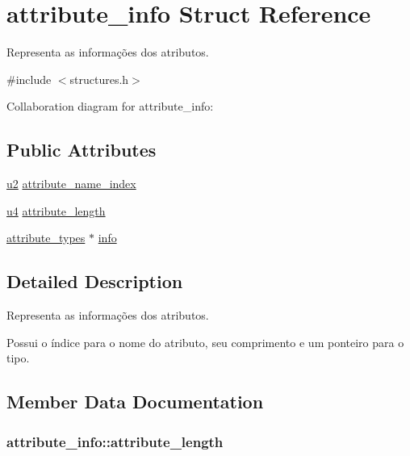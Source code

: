\hypertarget{structattribute__info}{}\section{attribute\+\_\+info Struct Reference}
\label{structattribute__info}


Representa as informações dos atributos.  




{\ttfamily \#include $<$structures.\+h$>$}



Collaboration diagram for attribute\+\_\+info\+:
\subsection*{Public Attributes}
\begin{DoxyCompactItemize}
\item 
\hyperlink{structures_8h_a55ef8d87fd202b8417704c089899c5b9}{u2} \hyperlink{structattribute__info_a19df9d4b42eb55ca5dc1bed98df89378}{attribute\+\_\+name\+\_\+index}
\item 
\hyperlink{structures_8h_ae391a1d79bb0c8cbc283f0283e3c098b}{u4} \hyperlink{structattribute__info_a1ed8f679458c4bb0ed3315721588f50d}{attribute\+\_\+length}
\item 
\hyperlink{unionattribute__types}{attribute\+\_\+types} $\ast$ \hyperlink{structattribute__info_a78e740adccb41defb505248c47093958}{info}
\end{DoxyCompactItemize}


\subsection{Detailed Description}
Representa as informações dos atributos. 

Possui o índice para o nome do atributo, seu comprimento e um ponteiro para o tipo. 

\subsection{Member Data Documentation}
\subsubsection[{\texorpdfstring{attribute\+\_\+length}{attribute_length}}]{ attribute\+\_\+info\+::attribute\+\_\+length}\hypertarget{structattribute__info_a1ed8f679458c4bb0ed3315721588f50d}{}\label{structattribute__info_a1ed8f679458c4bb0ed3315721588f50d}
